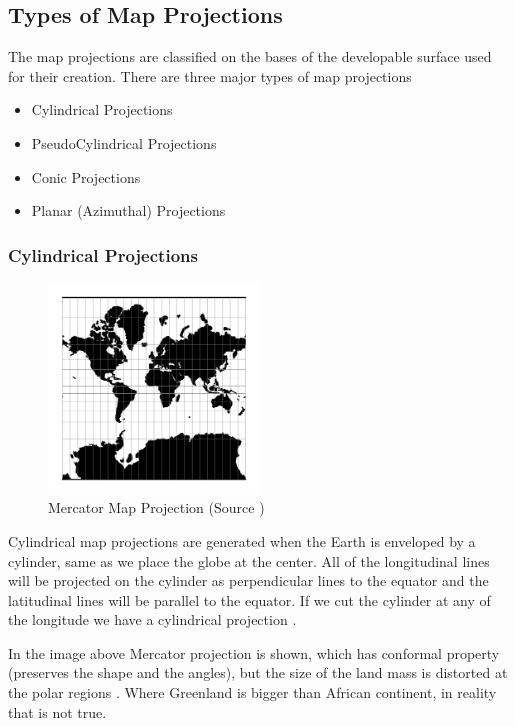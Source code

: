 \subsection{Types of Map Projections}

The map projections are classified on the bases of the developable surface used for their creation. There are three major types of map projections

\begin{itemize}
    \item Cylindrical Projections
    \item PseudoCylindrical Projections
    \item Conic Projections
    \item Planar (Azimuthal) Projections
\end{itemize}

\subsubsection{Cylindrical Projections}
\begin{figure}[H]
    \centering
    \includegraphics[width=0.5\textwidth]{figures/chapter-3/merc.png}
    \caption{Mercator Map Projection (Source \cite{PROJ_SITE})}
    \label{fig:merc}
\end{figure}

Cylindrical map projections are generated when the Earth is enveloped by a cylinder, same as we place the globe at the center. All of the longitudinal lines will be projected on the cylinder as perpendicular lines to the equator and the latitudinal lines  will be parallel to the equator. If we cut the cylinder at any of the longitude we have a cylindrical projection \cite{Snyder1982}.

In the image above Mercator projection is shown, which has conformal property (preserves the shape and the angles), but the size of the land mass is distorted at the polar regions \cite{GISGEO_Cylinder}. Where Greenland is bigger than African continent, in reality that is not true.


